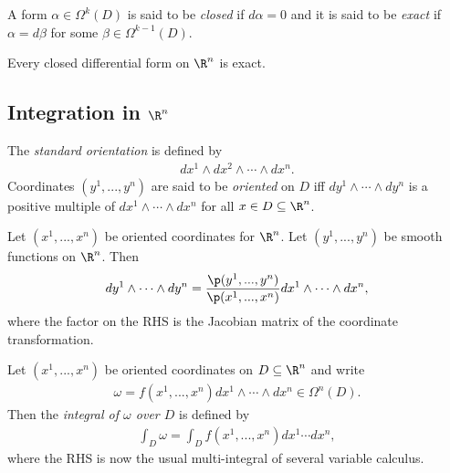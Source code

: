 \documentclass{article}
\begin{document}
\begin{definition}
    A form $\alpha\in\Omega^k(D)$ is said to be \emph{closed} if $d\alpha = 0$ and it is said
    to be \emph{exact} if $\alpha=d\beta$ for some $\beta\in\Omega^{k-1} (D)$.
\end{definition}

\begin{lemma}[Poincar\'e]
    Every closed differential form on $\R^n$ is exact.
\end{lemma}

\subsection{Integration in $\R^n$}

\begin{definition}
    The \emph{standard orientation} is defined by
    \begin{align*}
        dx^1\wedge dx^2 \wedge \cdots \wedge dx^n.
    \end{align*}
    Coordinates $(y^1, ..., y^n)$ are said to be \emph{oriented} on $D$ iff
    $dy^1\wedge\cdots\wedge dy^n$ is a positive multiple of $dx^1\wedge\cdots\wedge dx^n$
    for all $x\in D\subseteq \R^n$.
\end{definition}

\begin{proposition}
    Let $(x^1,...,x^n)$ be oriented coordinates for $\R^n$. Let $(y^1, ..., y^n)$ be 
    smooth functions on $\R^n$. Then
    \begin{align*}
        dy^1\wedge\cdots\wedge dy^n = \frac{\p(y^1,...,y^n)}{\p(x^1,...,x^n)}dx^1\wedge\cdots\wedge dx^n,
    \end{align*}
    where the factor on the RHS is the Jacobian matrix of the coordinate transformation.
\end{proposition}

\begin{definition}
    Let $(x^1,...,x^n)$ be oriented coordinates on $D\subseteq \R^n$ and write 
    \begin{align*}
        \omega = f(x^1, ..., x^n)dx^1\wedge\cdots\wedge dx^n\in\Omega^n(D).
    \end{align*}
    Then the \emph{integral of $\omega$ over $D$} is defined by
    \begin{align*}
        \int_D \omega = \int_D f(x^1,...,x^n)dx^1\cdots dx^n,
    \end{align*}
    where the RHS is now the usual multi-integral of several variable calculus.
\end{definition}
\end{document}
